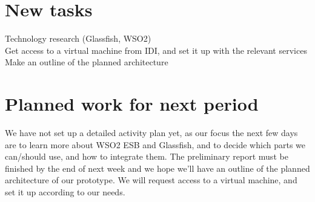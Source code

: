 \documentclass[titlepage]{article}
\begin{document}
    \section*{New tasks}
        Technology research (Glassfish, WSO2)
\\Get access to a virtual machine from IDI, and set it up with the relevant services
\\Make an outline of the planned architecture

    \section*{Planned work for next period}
        We have not set up a detailed activity plan yet, as our focus the next few days are to learn more about WSO2 ESB and Glassfish, and to decide which parts we can/should use, and how to integrate them. The preliminary report must be finished by the end of next week and we hope we’ll have an outline of the planned architecture of our prototype. We will request access to a virtual machine, and set it up according to our needs.
\end{document}
